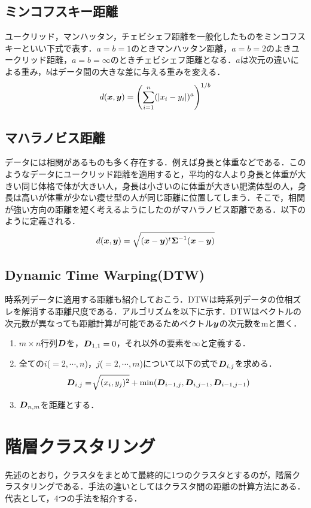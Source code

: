 \documentclass[a4j]{jsarticle}
\def\vec#1{\mbox{\boldmath $#1$}}
\begin{document}
\subsection{ミンコフスキー距離}
ユークリッド，マンハッタン，チェビシェフ距離を一般化したものをミンコフスキーといい下式で表す．$a=b=1$のときマンハッタン距離，$a=b=2$のよきユークリッド距離，$a=b=\infty$のときチェビシェフ距離となる．$a$は次元の違いによる重み，$b$はデータ間の大きな差に与える重みを変える．
\begin{equation}
	d(\vec{x},\vec{y}) = \left(\sum_{i=1}^{n}(|x_i-y_i|)^a\right)^{1/b}
\end{equation}
\subsection{マハラノビス距離}
データには相関があるものも多く存在する．例えば身長と体重などである．このようなデータにユークリッド距離を適用すると，平均的な人より身長と体重が大きい同じ体格で体が大きい人，身長は小さいのに体重が大きい肥満体型の人，身長は高いが体重が少ない痩せ型の人が同じ距離に位置してしまう．そこで，相関が強い方向の距離を短く考えるようにしたのがマハラノビス距離である．以下のように定義される．
\begin{equation}
	d(\vec{x},\vec{y}) = \sqrt{(\vec{x}-\vec{y})^t \vec{\Sigma}^{-1}(\vec{x}-\vec{y})}
\end{equation}
\subsection{Dynamic Time Warping(DTW)}
時系列データに適用する距離も紹介しておこう．DTWは時系列データの位相ズレを解消する距離尺度である．アルゴリズムを以下に示す．DTWはベクトルの次元数が異なっても距離計算が可能であるためベクトル$\vec{y}$の次元数をmと置く．
\begin{enumerate}
  \item $m\times n$行列$\vec{D}$を，$\vec{D}_{1,1}=0$，それ以外の要素を$\infty$と定義する．
  \item 全ての$i$($=2,\cdots,n$)，$j$($=2,\cdots,m$)について以下の式で$\vec{D}_{i,j}$を求める．
  \begin{align}
    \vec{D}_{i,j}=&\sqrt[~]{\mathstrut(x_{i},y_{j})^2}+ \min(\vec{D}_{i-1,j},\vec{D}_{i,j-1},\vec{D}_{i-1,j-1})
  \end{align}
  \item $\vec{D}_{n,m}$を距離とする．
\end{enumerate}


\section{階層クラスタリング}
先述のとおり，クラスタをまとめて最終的に1つのクラスタとするのが，階層クラスタリングである．手法の違いとしてはクラスタ間の距離の計算方法にある．代表として，4つの手法を紹介する．
\end{document}
